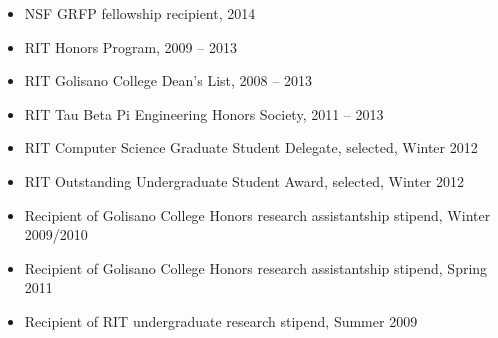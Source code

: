 \documentclass[10pt]{res}
\begin{document}
\begin{resume}
\begin{itemize} \itemsep -2pt
\item NSF GRFP fellowship recipient, 2014
\item RIT Honors Program, 2009 -- 2013
\item RIT Golisano College Dean's List, 2008 -- 2013
\item RIT Tau Beta Pi Engineering Honors Society, 2011 -- 2013
\item RIT Computer Science Graduate Student Delegate, selected, Winter 2012
\item RIT Outstanding Undergraduate Student Award, selected, Winter 2012
\item Recipient of Golisano College Honors research assistantship stipend, Winter 2009/2010
\item Recipient of Golisano College Honors research assistantship stipend, Spring 2011
\item Recipient of RIT undergraduate research stipend, Summer 2009
\end{itemize}

\end{resume}
\end{document}

